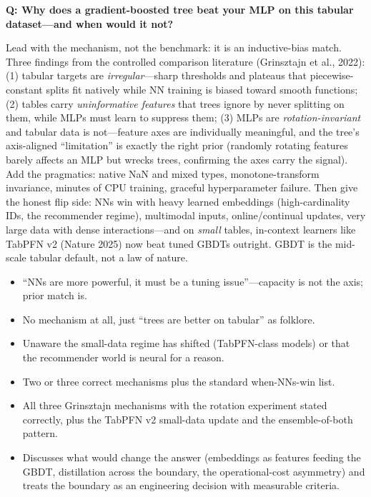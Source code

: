 \begin{interviewq}
\textbf{Q: Why does a gradient-boosted tree beat your MLP on this tabular dataset---and when would it not?}

 \quad {} \quad \badgefreq{\freqhigh}

\stronganswer

Lead with the mechanism, not the benchmark: it is an inductive-bias match. Three findings from the controlled comparison literature (Grinsztajn et al., 2022): (1) tabular targets are \textit{irregular}---sharp thresholds and plateaus that piecewise-constant splits fit natively while NN training is biased toward smooth functions; (2) tables carry \textit{uninformative features} that trees ignore by never splitting on them, while MLPs must learn to suppress them; (3) MLPs are \textit{rotation-invariant} and tabular data is not---feature axes are individually meaningful, and the tree's axis-aligned ``limitation'' is exactly the right prior (randomly rotating features barely affects an MLP but wrecks trees, confirming the axes carry the signal). Add the pragmatics: native NaN and mixed types, monotone-transform invariance, minutes of CPU training, graceful hyperparameter failure. Then give the honest flip side: NNs win with heavy learned embeddings (high-cardinality IDs, the recommender regime), multimodal inputs, online/continual updates, very large data with dense interactions---and on \textit{small} tables, in-context learners like TabPFN v2 (Nature 2025) now beat tuned GBDTs outright. GBDT is the mid-scale tabular default, not a law of nature.

\redflags
\begin{itemize}
    \item ``NNs are more powerful, it must be a tuning issue''---capacity is not the axis; prior match is.
    \item No mechanism at all, just ``trees are better on tabular'' as folklore.
    \item Unaware the small-data regime has shifted (TabPFN-class models) or that the recommender world is neural for a reason.
\end{itemize}


\goodgreat
\begin{itemize}
    \item {} Two or three correct mechanisms plus the standard when-NNs-win list.
    \item {} All three Grinsztajn mechanisms with the rotation experiment stated correctly, plus the TabPFN v2 small-data update and the ensemble-of-both pattern.
    \item {} Discusses what would change the answer (embeddings as features feeding the GBDT, distillation across the boundary, the operational-cost asymmetry) and treats the boundary as an engineering decision with measurable criteria.
\end{itemize}


\end{interviewq}
